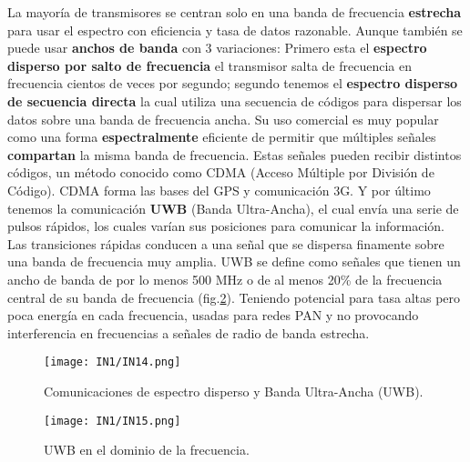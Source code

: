 \documentclass[
	12pt, %
	fleqn, %
	a4paper, %
]{LegrandOrangeBook}
\begin{document}
La mayoría de transmisores se centran solo en una banda de frecuencia \textbf{estrecha} para usar el espectro con eficiencia y tasa de datos razonable. Aunque también se puede usar \textbf{anchos de banda} con 3 variaciones: Primero esta el \textbf{espectro disperso por salto de frecuencia} el transmisor salta de frecuencia en frecuencia cientos de veces por segundo; segundo tenemos el \textbf{espectro disperso de secuencia directa} la cual utiliza una secuencia de códigos para dispersar los datos sobre una banda de frecuencia ancha. Su uso comercial es muy popular como una forma \textbf{espectralmente} eficiente de permitir que múltiples señales \textbf{compartan} la misma banda de frecuencia. Estas señales pueden recibir distintos códigos, un método conocido como CDMA (Acceso Múltiple por División de Código). CDMA forma las bases del GPS y comunicación 3G. Y por último tenemos la comunicación \textbf{UWB} (Banda Ultra-Ancha), el cual envía una serie de pulsos rápidos, los cuales varían sus posiciones para comunicar la información. Las transiciones rápidas conducen a una señal que se dispersa finamente sobre una banda de frecuencia muy amplia. UWB se define como señales que tienen un ancho de banda de por lo menos 500 MHz o de al menos 20\% de la frecuencia central de su banda de frecuencia (fig.\ref{fig: uwb}). Teniendo potencial para tasa altas pero poca energía en cada frecuencia, usadas para redes PAN y no provocando interferencia en frecuencias a señales de radio de banda estrecha.
\begin{figure}[]
\centering
\texttt{[image: IN1/IN14.png]}
\caption{Comunicaciones de espectro disperso y Banda Ultra-Ancha (UWB).}
\label{fig:anchos de banda variaciones}
\end{figure}
\begin{figure}[H]
\centering
\texttt{[image: IN1/IN15.png]}
\caption{UWB en el dominio de la frecuencia.}
\label{fig: uwb}
\end{figure}
\end{document}
